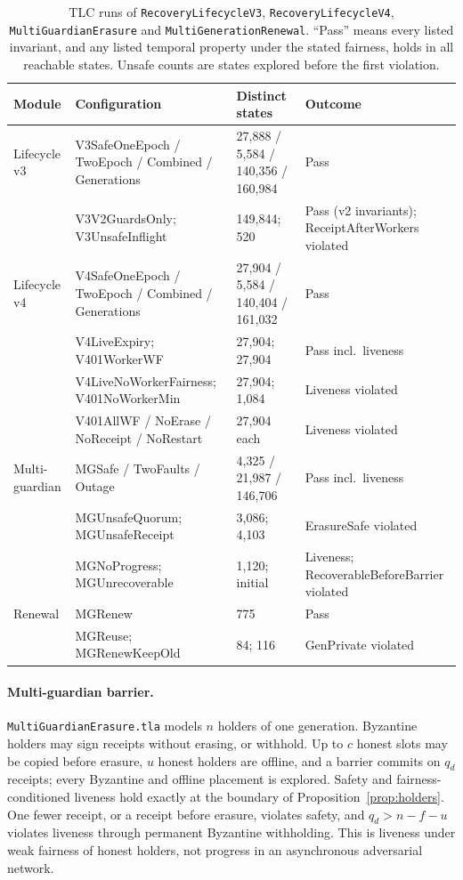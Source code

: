 \documentclass[pdflatex,sn-mathphys-num]{sn-jnl}
\theoremstyle{plain}
\theoremstyle{definition}
\newcommand{\code}[1]{\texttt{#1}}
\begin{document}
\begin{table}[htbp]
\caption{TLC runs of \code{RecoveryLifecycleV3}, \code{RecoveryLifecycleV4}, \code{MultiGuardianErasure} and \code{MultiGenerationRenewal}. ``Pass'' means every listed invariant, and any listed temporal property under the stated fairness, holds in all reachable states. Unsafe counts are states explored before the first violation.}\label{tab:tlc}
\centering\scriptsize
\begin{tabularx}{\linewidth}{@{}p{.19\linewidth}Yp{.17\linewidth}p{.2\linewidth}@{}}\toprule
Module & Configuration & Distinct states & Outcome\\\midrule
Lifecycle v3 & V3SafeOneEpoch / TwoEpoch / Combined / Generations & 27,888 / 5,584 / 140,356 / 160,984 & Pass\\
 & V3V2GuardsOnly; V3UnsafeInflight & 149,844; 520 & Pass (v2 invariants); Receipt\-After\-Workers violated\\
Lifecycle v4 & V4SafeOneEpoch / TwoEpoch / Combined / Generations & 27,904 / 5,584 / 140,404 / 161,032 & Pass\\
 & V4LiveExpiry; V401WorkerWF & 27,904; 27,904 & Pass incl.\ liveness\\
 & V4LiveNoWorkerFairness; V401NoWorkerMin & 27,904; 1,084 & Liveness violated\\
 & V401AllWF / NoErase / NoReceipt / NoRestart & 27,904 each & Liveness violated\\
Multi-guardian & MGSafe / TwoFaults / Outage & 4,325 / 21,987 / 146,706 & Pass incl.\ liveness\\
 & MGUnsafeQuorum; MGUnsafeReceipt & 3,086; 4,103 & ErasureSafe violated\\
 & MGNoProgress; MGUnrecoverable & 1,120; initial & Liveness; Recoverable\-Before\-Barrier violated\\
Renewal & MGRenew & 775 & Pass\\
 & MGReuse; MGRenewKeepOld & 84; 116 & GenPrivate violated\\\bottomrule
\end{tabularx}
\end{table}

\paragraph{Multi-guardian barrier.}
\code{MultiGuardianErasure.tla} models $n$ holders of one generation. Byzantine holders may sign receipts without erasing, or withhold. Up to $c$ honest slots may be copied before erasure, $u$ honest holders are offline, and a barrier commits on $q_d$ receipts; every Byzantine and offline placement is explored. Safety and fairness-conditioned liveness hold exactly at the boundary of Proposition~\ref{prop:holders}. One fewer receipt, or a receipt before erasure, violates safety, and $q_d>n-f-u$ violates liveness through permanent Byzantine withholding. This is liveness under weak fairness of honest holders, not progress in an asynchronous adversarial network.
\end{document}
